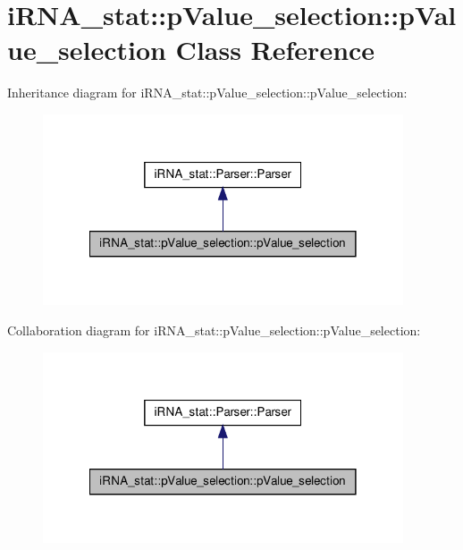 \hypertarget{classiRNA__stat_1_1pValue__selection_1_1pValue__selection}{
\section{i\-R\-N\-A\-\_\-stat\-:\-:p\-Value\-\_\-selection\-:\-:p\-Value\-\_\-selection \-Class \-Reference}
\label{classiRNA__stat_1_1pValue__selection_1_1pValue__selection}
}


\-Inheritance diagram for i\-R\-N\-A\-\_\-stat\-:\-:p\-Value\-\_\-selection\-:\-:p\-Value\-\_\-selection\-:
\nopagebreak
\begin{figure}[H]
\begin{center}
\leavevmode
\includegraphics[width=302pt]{classiRNA__stat_1_1pValue__selection_1_1pValue__selection__inherit__graph}
\end{center}
\end{figure}


\-Collaboration diagram for i\-R\-N\-A\-\_\-stat\-:\-:p\-Value\-\_\-selection\-:\-:p\-Value\-\_\-selection\-:
\nopagebreak
\begin{figure}[H]
\begin{center}
\leavevmode
\includegraphics[width=302pt]{classiRNA__stat_1_1pValue__selection_1_1pValue__selection__coll__graph}
\end{center}
\end{figure}
